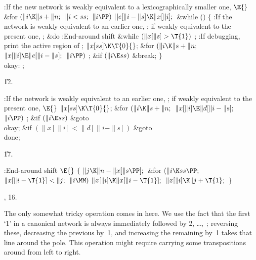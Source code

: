 \B{}:If the new network is weakly equivalent to a
lexicographically smaller one, \X${}\E{}$\6
\&{for} ${}(\|i\K\|s+\|n;{}$ ${}\|i<\\{ss};{}$ ${}\|i\PP){}$\1\5
${}\|e[\|i-\|s]\K\|x[\|i];{}$\2\6
\&{while} () $\{$ :If the  network is weakly equivalent to an
earlier one, ; if weakly equivalent to the present one, %
\X;\6
\&{do} :End-around shift \X \6
\&{while} ${}(\|x[\|s]>\T{1}){}$\1\5
;\2\6
:If debugging, print the active region of \X;\6
${}\|x[\\{ss}]\K\T{0}{}$;\6
\&{for} ${}(\|i\K\|s+\|n;{}$ ${}\|x[\|i]\E\|e[\|i-\|s];{}$ ${}\|i\PP){}$\1\5
;\2\6
\&{if} ${}(\|i\E\\{ss}){}$\1\5
\&{break};%
\2\6
$\}$ \6
\4\\{okay}:\5
;\par
\U12.\fi

\B{}:If the  network is weakly equivalent to an
earlier one, ; if weakly equivalent to the present one, %
\X${}\E{}$\6
$\|x[\\{ss}]\K\T{0}{}$;\6
\&{for} ${}(\|i\K\|s+\|n;{}$ ${}\|x[\|i]\E\|d[\|i-\|s];{}$ ${}\|i\PP){}$\1\5
;\2\6
\&{if} ${}(\|i\E\\{ss}){}$\1\5
\&{goto} \\{okay};\2\6
\&{if} ${}(\|x[\|i]<\|d[\|i-\|s]){}$\1\5
\&{goto} \\{done};\2\par
\U17.\fi

\B{}:End-around shift \X${}\E{}$\6
${}\{{}$\1\6
${}\|j\K\|n-\|x[\|s\PP];{}$\6
\&{for} ${}(\|i\K\\{ss}\PP;{}$ ${}\|x[\|i-\T{1}]<\|j;{}$ ${}\|i\MM){}$\1\5
${}\|x[\|i]\K\|x[\|i-\T{1}];{}$\2\6
${}\|x[\|i]\K\|j+\T{1};{}$\6
\4${}\}{}$\2\par
{}, 16.\fi

The only somewhat tricky operation comes in here. We use
the fact that
the first `1' in a canonical network is always immediately followed by
2, \dots,~; reversing these, decreasing the previous by~1, and
increasing
the remaining by~1 takes that line around the pole. This operation might
require carrying some transpositions around from left to right.

